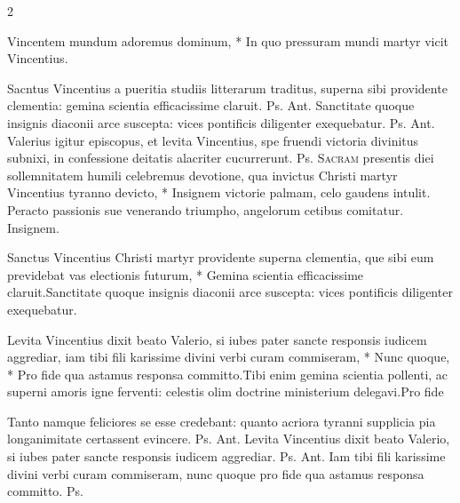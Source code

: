 \begin{multicols*}{2}
\begin{invitatory}
{Vincentem mundum adoremus dominum, * In quo pressuram mundi martyr vicit Vincentius.}
\end{invitatory}
 Sacntus Vincentius a pueritia studiis litterarum traditus, superna sibi providente clementia: gemina scientia efficacissime claruit. {\color{Red} Ps.}  {\color{Red} Ant.} Sanctitate quoque insignis diaconii arce suscepta: vices pontificis diligenter exequebatur. {\color{Red} Ps.}  {\color{Red} Ant.} Valerius igitur episcopus, et levita Vincentius, spe fruendi victoria divinitus subnixi, in confessione deitatis alacriter cucurrerunt. {\color{Red} Ps.}  \R
\lettrine[lines=2]{\zallmancaps \color{Blue} S}{acram} \hypertarget{sacram-presentis-diei}{\label{sacram-presentis-diei}} presentis diei sollemnitatem humili celebremus devotione, qua invictus Christi martyr Vincentius tyranno devicto, * Insignem victorie palmam, celo gaudens intulit. \V Peracto passionis sue venerando triumpho, angelorum cetibus comitatur. Insignem.
\begin{responsory}
{Sanctus Vincentius Christi martyr providente superna clementia, que sibi eum previdebat vas electionis futurum, * Gemina scientia efficacissime claruit.}{Sanctitate quoque insignis diaconii arce suscepta: vices pontificis diligenter exequebatur.}
\end{responsory}%
\begin{responsory-final}
{Levita Vincentius dixit beato Valerio, si iubes pater sancte responsis iudicem aggrediar, iam tibi fili karissime divini verbi curam commiseram, * Nunc quoque, * Pro fide qua astamus responsa committo.}{Tibi enim gemina scientia pollenti, ac superni amoris igne ferventi: celestis olim doctrine ministerium delegavi.}{Pro fide}
\end{responsory-final}%
 Tanto namque feliciores se esse credebant: quanto acriora tyranni supplicia pia longanimitate certassent evincere. {\color{Red} Ps.}  {\color{Red} Ant.} Levita Vincentius dixit beato Valerio, si iubes pater sancte responsis iudicem aggrediar. {\color{Red} Ps.}  {\color{Red} Ant.} Iam tibi fili karissime divini verbi curam commiseram, nunc quoque pro fide qua astamus responsa committo. {\color{Red} Ps.} 
\begin{responsory}

\end{responsory}
\end{multicols*}
